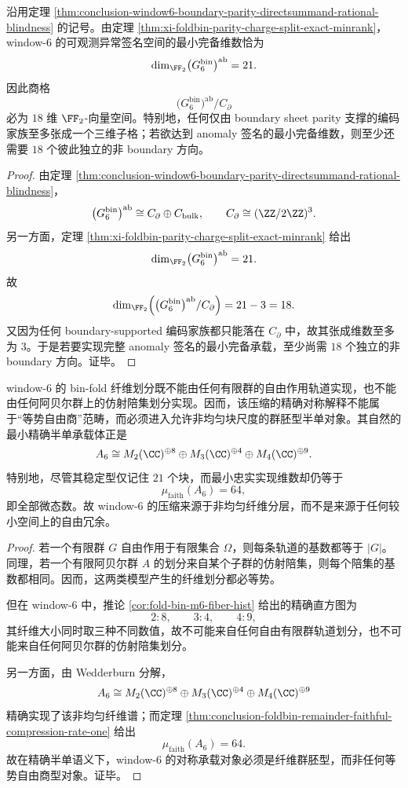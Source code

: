 \begin{corollary}\label{cor:conclusion-window6-boundary-parity-misses-eighteen-anomaly-directions}
沿用定理 \ref{thm:conclusion-window6-boundary-parity-directsummand-rational-blindness} 的记号。由定理 \ref{thm:xi-foldbin-parity-charge-split-exact-minrank}，window-\(6\) 的可观测异常签名空间的最小完备维数恰为
\[
\dim_{\FF_2}\bigl(G_6^{\mathrm{bin}}\bigr)^{\mathrm{ab}}=21.
\]
因此商格
\[
\bigl(G_6^{\mathrm{bin}}\bigr)^{\mathrm{ab}}/C_{\partial}
\]
必为 \(18\) 维 \(\FF_2\)-向量空间。特别地，任何仅由 boundary sheet parity 支撑的编码家族至多张成一个三维子格；若欲达到 anomaly 签名的最小完备维数，则至少还需要 \(18\) 个彼此独立的非 boundary 方向。
\end{corollary}
\begin{proof}
由定理 \ref{thm:conclusion-window6-boundary-parity-directsummand-rational-blindness}，
\[
\bigl(G_6^{\mathrm{bin}}\bigr)^{\mathrm{ab}}
\cong
C_{\partial}\oplus C_{\mathrm{bulk}},
\qquad
C_{\partial}\cong (\ZZ/2\ZZ)^3.
\]
另一方面，定理 \ref{thm:xi-foldbin-parity-charge-split-exact-minrank} 给出
\[
\dim_{\FF_2}\bigl(G_6^{\mathrm{bin}}\bigr)^{\mathrm{ab}}=21.
\]
故
\[
\dim_{\FF_2}\Bigl(\bigl(G_6^{\mathrm{bin}}\bigr)^{\mathrm{ab}}/C_{\partial}\Bigr)=21-3=18.
\]
又因为任何 boundary-supported 编码家族都只能落在 \(C_{\partial}\) 中，故其张成维数至多为 \(3\)。于是若要实现完整 anomaly 签名的最小完备承载，至少尚需 \(18\) 个独立的非 boundary 方向。证毕。
\end{proof}

\begin{theorem}\label{thm:conclusion-window6-groupoid-rather-than-free-quotient}
window-\(6\) 的 bin-fold 纤维划分既不能由任何有限群的自由作用轨道实现，也不能由任何阿贝尔群上的仿射陪集划分实现。因而，该压缩的精确对称解释不能属于“等势自由商”范畴，而必须进入允许非均匀块尺度的群胚型半单对象。其自然的最小精确半单承载体正是
\[
A_6
\cong
M_2(\CC)^{\oplus 8}\oplus M_3(\CC)^{\oplus 4}\oplus M_4(\CC)^{\oplus 9}.
\]
特别地，尽管其稳定型仅记住 \(21\) 个块，而最小忠实实现维数却仍等于
\[
\mu_{\mathrm{faith}}(A_6)=64,
\]
即全部微态数。故 window-\(6\) 的压缩来源于非均匀纤维分层，而不是来源于任何较小空间上的自由冗余。
\end{theorem}
\begin{proof}
若一个有限群 \(G\) 自由作用于有限集合 \(\Omega\)，则每条轨道的基数都等于 \(|G|\)。同理，若一个有限阿贝尔群 \(A\) 的划分来自某个子群的仿射陪集，则每个陪集的基数都相同。因而，这两类模型产生的纤维划分都必等势。

但在 window-\(6\) 中，推论 \ref{cor:fold-bin-m6-fiber-hist} 给出的精确直方图为
\[
2:8,\qquad 3:4,\qquad 4:9,
\]
其纤维大小同时取三种不同数值，故不可能来自任何自由有限群轨道划分，也不可能来自任何阿贝尔群的仿射陪集划分。

另一方面，由 Wedderburn 分解，
\[
A_6\cong M_2(\CC)^{\oplus 8}\oplus M_3(\CC)^{\oplus 4}\oplus M_4(\CC)^{\oplus 9}
\]
精确实现了该非均匀纤维谱；而定理 \ref{thm:conclusion-foldbin-remainder-faithful-compression-rate-one} 给出
\[
\mu_{\mathrm{faith}}(A_6)=64.
\]
故在精确半单语义下，window-\(6\) 的对称承载对象必须是纤维群胚型，而非任何等势自由商型对象。证毕。
\end{proof}

